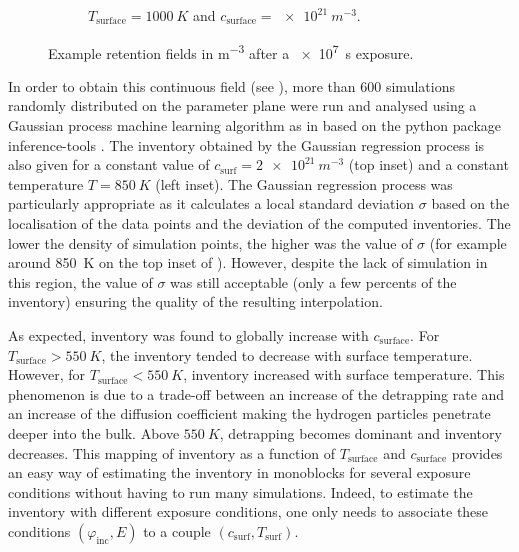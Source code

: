 \begin{figure}
\begin{subfigure}{0.5\linewidth}
        \caption{$T_\mathrm{surface} = \SI{1000}{K}$ and $c_\mathrm{surface} = \SI{e21}{m^{-3}}$.}
    \end{subfigure}
    \caption{Example retention fields in \si{m^{-3}} after a \SI{e7}{s} exposure.}
\end{figure}


In order to obtain this continuous field (see ), more than 600 simulations randomly distributed on the parameter plane were run and analysed using a Gaussian process machine learning algorithm  as in  based on the python package inference-tools .
The inventory obtained by the Gaussian regression process is also given for a constant value of $c_\mathrm{surf}=\SI{2e21}{m^{-3}}$ (top inset) and a constant temperature $T=\SI{850}{K}$ (left inset).
The Gaussian regression process was particularly appropriate as it calculates a local standard deviation $\sigma$ based on the localisation of the data points and the deviation of the computed inventories.
The lower the density of simulation points, the higher was the value of $\sigma$ (for example around \SI{850}{K} on the top inset of ).
However, despite the lack of simulation in this region, the value of $\sigma$ was still acceptable (only a few percents of the inventory) ensuring the quality of the resulting interpolation.

As expected, inventory was found to globally increase with $c_\mathrm{surface}$.
For $T_\mathrm{surface} > \SI{550}{K}$, the inventory tended to decrease with surface temperature.
However, for $T_\mathrm{surface} < \SI{550}{K}$, inventory increased with surface temperature.
This phenomenon is due to a trade-off between an increase of the detrapping rate and an increase of the diffusion coefficient making the hydrogen particles penetrate deeper into the bulk.
Above $\SI{550}{K}$, detrapping becomes dominant and inventory decreases.
This mapping of inventory as a function of $T_\mathrm{surface}$ and $c_\mathrm{surface}$ provides an easy way of estimating the inventory in monoblocks for several exposure conditions without having to run many simulations.
Indeed, to estimate the inventory with different exposure conditions, one only needs to associate these conditions $(\varphi_\mathrm{inc}, E)$ to a couple $(c_\mathrm{surf}, T_\mathrm{surf})$.


